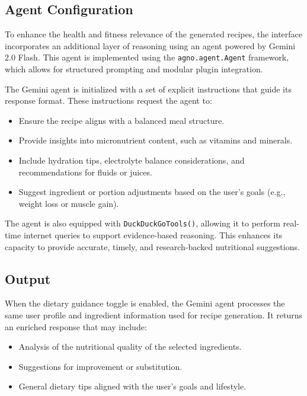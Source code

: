 \documentclass[letterpaper,11pt]{report}
\begin{document}
\subsection{Agent Configuration}

To enhance the health and fitness relevance of the generated recipes, the interface incorporates an additional layer of reasoning using an agent powered by Gemini 2.0 Flash. This agent is implemented using the \texttt{agno.agent.Agent} framework, which allows for structured prompting and modular plugin integration.

The Gemini agent is initialized with a set of explicit instructions that guide its response format. These instructions request the agent to:

\begin{itemize}
  \item Ensure the recipe aligns with a balanced meal structure.
  \item Provide insights into micronutrient content, such as vitamins and minerals.
  \item Include hydration tips, electrolyte balance considerations, and recommendations for fluids or juices.
  \item Suggest ingredient or portion adjustments based on the user’s goals (e.g., weight loss or muscle gain).
\end{itemize}

The agent is also equipped with \texttt{DuckDuckGoTools()}, allowing it to perform real-time internet queries to support evidence-based reasoning. This enhances its capacity to provide accurate, timely, and research-backed nutritional suggestions.

\subsection{Output}

When the dietary guidance toggle is enabled, the Gemini agent processes the same user profile and ingredient information used for recipe generation. It returns an enriched response that may include:

\begin{itemize}
  \item Analysis of the nutritional quality of the selected ingredients.
  \item Suggestions for improvement or substitution.
  \item General dietary tips aligned with the user’s goals and lifestyle.
\end{itemize}
\end{document}
